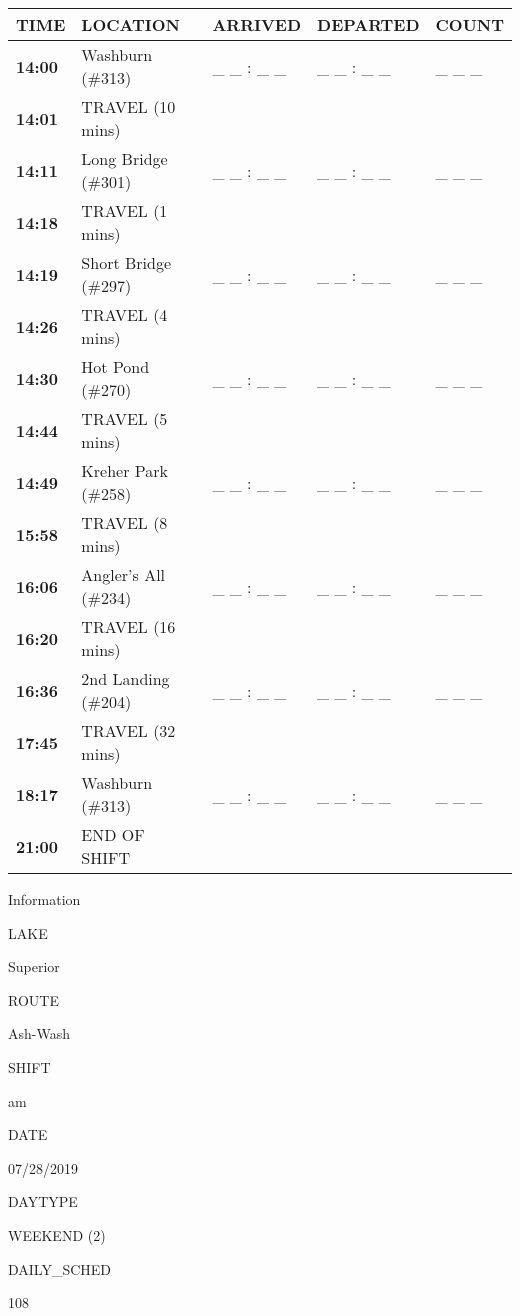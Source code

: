 \documentclass[]{article}
\begin{document}
\begin{tabular}{>{\bfseries}lllll}
\toprule
\textbf{TIME} & \textbf{LOCATION} & \textbf{ARRIVED} & \textbf{DEPARTED} & \textbf{COUNT}\\
\midrule
14:00 & Washburn (\#313) & \_ \_ : \_ \_ & \_ \_ : \_ \_ & \_ \_ \_\\
14:01 & TRAVEL (10 mins) &  &  & \\
14:11 & Long Bridge (\#301) & \_ \_ : \_ \_ & \_ \_ : \_ \_ & \_ \_ \_\\
14:18 & TRAVEL (1 mins) &  &  & \\
14:19 & Short Bridge (\#297) & \_ \_ : \_ \_ & \_ \_ : \_ \_ & \_ \_ \_\\
14:26 & TRAVEL (4 mins) &  &  & \\
14:30 & Hot Pond (\#270) & \_ \_ : \_ \_ & \_ \_ : \_ \_ & \_ \_ \_\\
14:44 & TRAVEL (5 mins) &  &  & \\
14:49 & Kreher Park (\#258) & \_ \_ : \_ \_ & \_ \_ : \_ \_ & \_ \_ \_\\
15:58 & TRAVEL (8 mins) &  &  & \\
16:06 & Angler's All (\#234) & \_ \_ : \_ \_ & \_ \_ : \_ \_ & \_ \_ \_\\
16:20 & TRAVEL (16 mins) &  &  & \\
16:36 & 2nd Landing (\#204) & \_ \_ : \_ \_ & \_ \_ : \_ \_ & \_ \_ \_\\
17:45 & TRAVEL (32 mins) &  &  & \\
18:17 & Washburn (\#313) & \_ \_ : \_ \_ & \_ \_ : \_ \_ & \_ \_ \_\\
21:00 & END OF SHIFT &  &  & \\
\bottomrule
\end{tabular}\newpage

Information

LAKE

Superior

ROUTE

Ash-Wash

SHIFT

am

DATE

07/28/2019

DAYTYPE

WEEKEND (2)

DAILY\_SCHED

108

\vspace{24pt}
\end{document}
